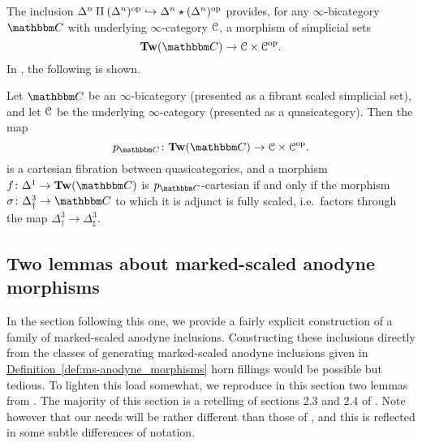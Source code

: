 \documentclass[main.tex]{subfiles}
\begin{document}
The inclusion $\Delta^{n} \amalg (\Delta^{n})^{\mathrm{op}} \hookrightarrow \Delta^{n} \star (\Delta^{n})^{\mathrm{op}}$ provides, for any $\infty$-bicategory $\CC$ with underlying $\infty$-category $\mathcal{C}$, a morphism of simplicial sets
\begin{equation*}
  \Tw(\CC) \to \category{C} \times \category{C}\op.
\end{equation*}
In \cite{garcia2020enhanced}, the following is shown.

\begin{theorem}
  \label{thm:mainthm_walker_fernando}
  Let $\CC$ be an $\infty$-bicategory (presented as a fibrant scaled simplicial set), and let $\mathcal{C}$ be the underlying $\infty$-category (presented as a quasicategory). Then the map
  \begin{equation*}
    p_{\CC}\colon \Tw(\CC) \to \category{C} \times \category{C}\op.
  \end{equation*}
  is a cartesian fibration between quasicategories, and a morphism $f\colon \Delta^{1} \to \Tw(\CC)$ is $p_{\CC}$-cartesian if and only if the morphism $\sigma\colon \Delta^{3}_{\dagger} \to \CC$ to which it is adjunct is fully scaled, i.e.\ factors through the map $\Delta^{3}_{\dagger} \to \Delta^{3}_{\sharp}$.
\end{theorem}

%

\subsection{Two lemmas about marked-scaled anodyne morphisms}
\label{ssc:two_lemmas_about_marked_scaled_anodyne_morphisms}

In the section following this one, we provide a fairly explicit construction of a family of marked-scaled anodyne inclusions. Constructing these inclusions directly from the classes of generating marked-scaled anodyne inclusions given in \hyperref[def:ms-anodyne_morphisms]{Definition~\ref*{def:ms-anodyne_morphisms}} horn fillings would be possible but tedious. To lighten this load somewhat, we reproduce in this section two lemmas from \cite{garcia2cartesianfibrationsii}. The majority of this section is a retelling of sections 2.3 and 2.4 of \cite{garcia2cartesianfibrationsii}. Note however that our needs will be rather different than those of \cite{garcia2cartesianfibrationsii}, and this is reflected in some subtle differences of notation.
\end{document}

